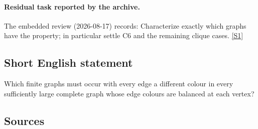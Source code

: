 \documentclass[11pt,a4paper]{article}
\newcommand{\sref}[2]{\hyperlink{source:#1:#2}{[S#2]}}
\begin{document}
\paragraph{Residual task reported by the archive.}

The embedded review (2026-08-17) records: Characterize exactly which graphs have the property; in particular settle C6 and the remaining clique cases. \sref{statement}{1}

\subsection{Short English statement}

Which finite graphs must occur with every edge a different colour in every sufficiently large complete graph whose edge colours are balanced at each vertex?

\subsection{Sources}
\end{document}
